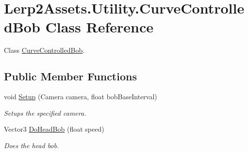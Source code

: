 \hypertarget{class_lerp2_assets_1_1_utility_1_1_curve_controlled_bob}{}\section{Lerp2\+Assets.\+Utility.\+Curve\+Controlled\+Bob Class Reference}
\label{class_lerp2_assets_1_1_utility_1_1_curve_controlled_bob}


Class \hyperlink{class_lerp2_assets_1_1_utility_1_1_curve_controlled_bob}{Curve\+Controlled\+Bob}.  


\subsection*{Public Member Functions}
\begin{DoxyCompactItemize}
\item 
void \hyperlink{class_lerp2_assets_1_1_utility_1_1_curve_controlled_bob_a8d8e6b44790dd78291c06239bc866ccc}{Setup} (Camera camera, float bob\+Base\+Interval)
\begin{DoxyCompactList}\small\item\em Setups the specified camera. \end{DoxyCompactList}\item 
Vector3 \hyperlink{class_lerp2_assets_1_1_utility_1_1_curve_controlled_bob_a2e72d2f536afd2f2b5bd73c363bb13b1}{Do\+Head\+Bob} (float speed)
\begin{DoxyCompactList}\small\item\em Does the head bob. \end{DoxyCompactList}\end{DoxyCompactItemize}
